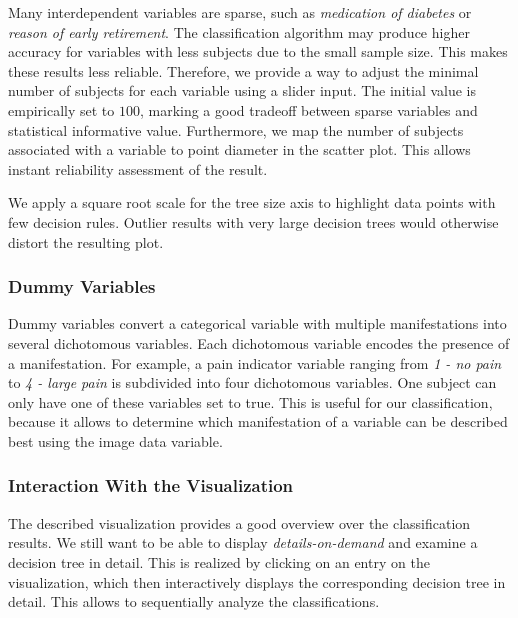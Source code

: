 \documentclass[a4paper,twoside]{style/article}
\newcommand{\com}[1]{\textcolor{orange}{\uline{#1}}}
\begin{document}
Many interdependent variables are sparse, such as \emph{medication of diabetes} or \emph{reason of early retirement}.
The classification algorithm may produce higher accuracy for variables with less subjects due to the small sample size.
This makes these results less reliable.
Therefore, we provide a way to adjust the minimal number of subjects for each variable using a slider input.
The initial value is empirically set to $100$, marking a good tradeoff between sparse variables and statistical informative value.
Furthermore, we map the number of subjects associated with a variable to point diameter in the scatter plot.
This allows instant reliability assessment of the result.

We apply a square root scale for the tree size axis to highlight data points with few decision rules.
Outlier results with very large decision trees would otherwise distort the resulting plot.

%
\subsubsection{Dummy Variables}
Dummy variables convert a categorical variable with multiple manifestations into several dichotomous variables.
Each dichotomous variable encodes the presence of a manifestation.
For example, a pain indicator variable ranging from \emph{1 - no pain} to \emph{4 - large pain} is subdivided into four dichotomous variables. %
One subject can only have one of these variables set to true.
This is useful for our classification, because it allows to determine which manifestation of a variable can be described best using the image data variable.
\subsubsection{Interaction With the Visualization}
The described visualization provides a good overview over the classification results.
We still want to be able to display \emph{details-on-demand} \cite{shneiderman1996} and examine a decision tree in detail.
This is realized by clicking on an entry on the visualization, which then interactively displays the corresponding decision tree in detail.
This allows to sequentially analyze the classifications.
\end{document}

